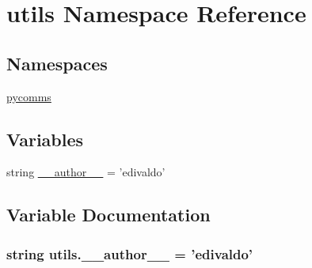 \hypertarget{namespaceutils}{}\section{utils Namespace Reference}
\label{namespaceutils}
\subsection*{Namespaces}
\begin{DoxyCompactItemize}
\item 
 \hyperlink{namespaceutils_1_1pycomms}{pycomms}
\end{DoxyCompactItemize}
\subsection*{Variables}
\begin{DoxyCompactItemize}
\item 
string \hyperlink{namespaceutils_aeb6687368997f6715177ec772a5b2353}{\+\_\+\+\_\+author\+\_\+\+\_\+} = 'edivaldo'
\end{DoxyCompactItemize}


\subsection{Variable Documentation}
\hypertarget{namespaceutils_aeb6687368997f6715177ec772a5b2353}{}
\subsubsection[{\+\_\+\+\_\+author\+\_\+\+\_\+}]{\setlength{\rightskip}{0pt plus 5cm}string utils.\+\_\+\+\_\+author\+\_\+\+\_\+ = 'edivaldo'}\label{namespaceutils_aeb6687368997f6715177ec772a5b2353}
